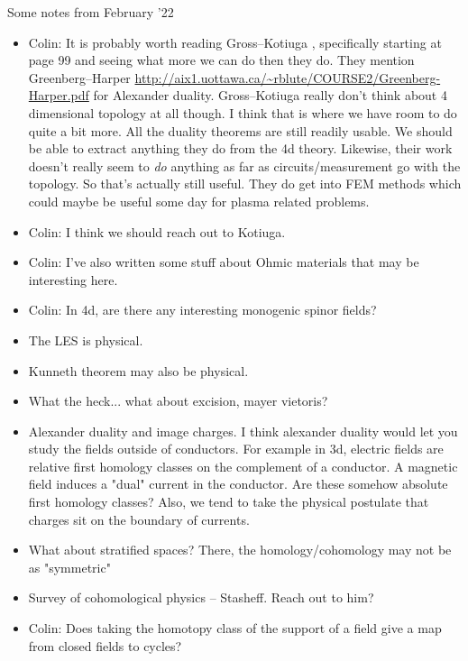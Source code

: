 \documentclass{article}
\begin{document}
Some notes from February '22
\begin{itemize}
    \item Colin: It is probably worth reading Gross--Kotiuga \cite{gross_electromagnetic_2004}, specifically starting at page 99 and seeing what more we can do then they do. They mention Greenberg--Harper \url{http://aix1.uottawa.ca/~rblute/COURSE2/Greenberg-Harper.pdf} for Alexander duality. Gross--Kotiuga really don't think about 4 dimensional topology at all though. I think that is where we have room to do quite a bit more. All the duality theorems are still readily usable. We should be able to extract anything they do from the 4d theory. Likewise, their work doesn't really seem to \emph{do} anything as far as circuits/measurement go with the topology. So that's actually still useful. They do get into FEM methods which could maybe be useful some day for plasma related problems.
    \item Colin: I think we should reach out to Kotiuga.
    \item Colin: I've also written some stuff about Ohmic materials that may be interesting here.
    \item Colin: In 4d, are there any interesting monogenic spinor fields?
    \item The LES is physical.
    \item Kunneth theorem may also be physical.
    \item What the heck... what about excision, mayer vietoris? 
    \item Alexander duality and image charges. I think alexander duality would let you study the fields outside of conductors. For example in 3d, electric fields are relative first homology classes on the complement of a conductor. A magnetic field induces a "dual" current in the conductor. Are these somehow absolute first homology classes? Also, we tend to take the physical postulate that charges sit on the boundary of currents.
    \item What about stratified spaces? There, the homology/cohomology may not be as "symmetric"
    \item Survey of cohomological physics -- Stasheff. Reach out to him? 
    \item Colin: Does taking the homotopy class of the support of a field give a map from closed fields to cycles?
\end{itemize}
\end{document}
